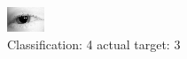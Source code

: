 \begin{figure}[h!]
\begin{center}
\includegraphics[width=0.60\columnwidth]{figures/ID53_class_4_target_3.png}
\end{center}
\caption{ Classification: 4 actual target: 3}
\label{fig:ID53_class_4_target_3}
\end{figure}
